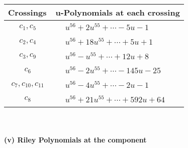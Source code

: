 \documentclass[1p]{elsarticle_modified}
\theoremstyle{definition}
\begin{document}
\begin{tabular}{m{50pt}|m{274pt}}
Crossings & \hspace{64pt}u-Polynomials at each crossing \\
\hline $$\begin{aligned}c_{1},c_{5}\end{aligned}$$&$\begin{aligned}
&u^{56}+2 u^{55}+\cdots-5 u-1
\end{aligned}$\\
\hline $$\begin{aligned}c_{2},c_{4}\end{aligned}$$&$\begin{aligned}
&u^{56}+18 u^{55}+\cdots+5 u+1
\end{aligned}$\\
\hline $$\begin{aligned}c_{3},c_{9}\end{aligned}$$&$\begin{aligned}
&u^{56}- u^{55}+\cdots+12 u+8
\end{aligned}$\\
\hline $$\begin{aligned}c_{6}\end{aligned}$$&$\begin{aligned}
&u^{56}-2 u^{55}+\cdots-145 u-25
\end{aligned}$\\
\hline $$\begin{aligned}c_{7},c_{10},c_{11}\end{aligned}$$&$\begin{aligned}
&u^{56}-4 u^{55}+\cdots-2 u-1
\end{aligned}$\\
\hline $$\begin{aligned}c_{8}\end{aligned}$$&$\begin{aligned}
&u^{56}+21 u^{55}+\cdots+592 u+64
\end{aligned}$\\
\hline
\end{tabular}\\~\\
\newpage\renewcommand{\arraystretch}{1}
\flushleft \textbf{(v) Riley Polynomials at the component}\newline \\
\end{document}
